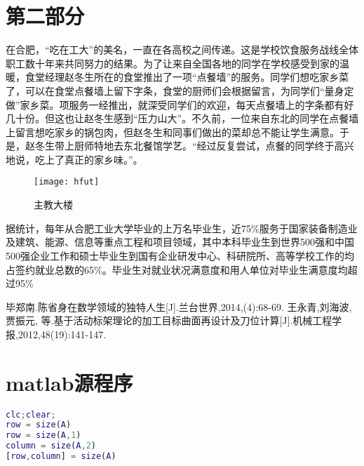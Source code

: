 \documentclass{hfutpaper}
\newcommand{\upcite}[1]{\textsuperscript{\textsuperscript{\cite{#1}}}}
\begin{document}
\section{第二部分}
在合肥，“吃在工大”的美名，一直在各高校之间传递。这是学校饮食服务战线全体职工数十年来共同努力的结果。为了让来自全国各地的同学在学校感受到家的温暖，食堂经理赵冬生所在的食堂推出了一项“点餐墙”的服务。同学们想吃家乡菜了，可以在食堂点餐墙上留下字条，食堂的厨师们会根据留言，为同学们“量身定做”家乡菜。项服务一经推出，就深受同学们的欢迎，每天点餐墙上的字条都有好几十份。但这也让赵冬生感到“压力山大”。不久前，一位来自东北的同学在点餐墙上留言想吃家乡的锅包肉，但赵冬生和同事们做出的菜却总不能让学生满意。于是，赵冬生带上厨师特地去东北餐馆学艺。“经过反复尝试，点餐的同学终于高兴地说，吃上了真正的家乡味。”。
\begin{figure}[H]%
	\centering  %
	\texttt{[image: hfut]}  %
	\caption{主教大楼}  %
	\label{fig1}
\end{figure}
据统计，每年从合肥工业大学毕业的上万名毕业生，近75\%服务于国家装备制造业及建筑、能源、信息等重点工程和项目领域，其中本科毕业生到世界500强和中国500强企业工作和硕士毕业生到国有企业研发中心、科研院所、高等学校工作的均占签约就业总数的65\%。毕业生对就业状况满意度和用人单位对毕业生满意度均超过95\%\upcite{bib:two}
\begin{thebibliography}{9}%
 毕郑南.陈省身在数学领域的独特人生[J].兰台世界,2014,(4):68-69.
 王永青,刘海波,贾振元, 等.基于活动标架理论的加工目标曲面再设计及刀位计算[J].机械工程学报,2012,48(19):141-147.
\end{thebibliography}
\section*{matlab源程序}
\begin{lstlisting}[language=matlab]
clc;clear;
row = size(A)
row = size(A,1)
column = size(A,2)
[row,column] = size(A)
\end{lstlisting}
\end{document}
